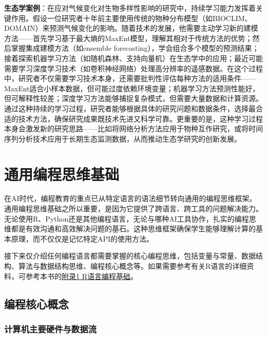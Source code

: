 \documentclass[
  twoside]{book}
\begin{document}
\textbf{生态学案例}：在应对气候变化对生物多样性影响的研究中，持续学习能力发挥着关键作用。假设一位研究者十年前主要使用传统的物种分布模型（如BIOCLIM、DOMAIN）来预测气候变化的影响。随着技术的发展，他需要主动学习新的建模方法------首先学习基于最大熵的MaxEnt模型，理解其相对于传统方法的优势；然后掌握集成建模方法（如ensemble forecasting），学会组合多个模型的预测结果；接着探索机器学习方法（如随机森林、支持向量机）在生态学中的应用；最近可能需要学习深度学习技术（如卷积神经网络）处理高分辨率的遥感数据。在这个过程中，研究者不仅需要学习技术本身，还需要批判性评估每种方法的适用条件------MaxEnt适合小样本数据，但可能过度依赖环境变量；机器学习方法预测性能好，但可解释性较差；深度学习方法能够捕捉复杂模式，但需要大量数据和计算资源。通过这种持续的学习过程，研究者能够根据具体的研究问题和数据条件，选择最合适的技术方法，确保研究成果既技术先进又科学可靠。更重要的是，这种学习过程本身会激发新的研究思路------比如将网络分析方法应用于物种互作研究，或将时间序列分析技术应用于长期生态监测数据，从而推动生态学研究的创新发展。

\hypertarget{ux901aux7528ux7f16ux7a0bux601dux7ef4ux57faux7840}{%
\section{通用编程思维基础}\label{ux901aux7528ux7f16ux7a0bux601dux7ef4ux57faux7840}}

在AI时代，编程教育的重点已从特定语言的语法细节转向通用的编程思维框架。通用编程思维基础之所以重要，是因为它提供了跨语言、跨工具的问题解决能力。无论使用R、Python还是其他编程语言，无论与哪种AI工具协作，扎实的编程思维都是有效沟通和高效解决问题的基石。这种思维框架确保学生能够理解计算的基本原理，而不仅仅是记忆特定API的使用方法。

接下来仅介绍任何编程语言都需要掌握的核心编程思维，包括变量与常量、数据结构、算法与数据结构思维、编程核心概念等。如果需要参考有关R语言的详细资料，可参考本书的\protect\hyperlink{ux9644ux5f551-rux8bedux8a00ux7f16ux7a0bux57faux7840}{附录1 R语言编程基础}。

\hypertarget{ux7f16ux7a0bux6838ux5fc3ux6982ux5ff5}{%
\subsection{编程核心概念}\label{ux7f16ux7a0bux6838ux5fc3ux6982ux5ff5}}

\hypertarget{ux8ba1ux7b97ux673aux4e3bux8981ux786cux4ef6ux4e0eux6570ux636eux6d41}{%
\subsubsection{计算机主要硬件与数据流}\label{ux8ba1ux7b97ux673aux4e3bux8981ux786cux4ef6ux4e0eux6570ux636eux6d41}}
\end{document}
